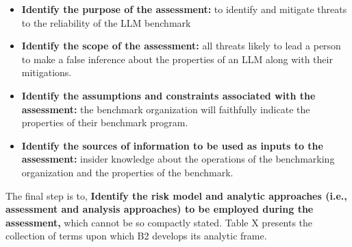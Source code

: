 \documentclass{article}
\begin{document}
\begin{itemize}
    \item {\bf Identify the purpose of the assessment:} to identify and mitigate threats to the reliability of the LLM benchmark
    \item {\bf Identify the scope of the assessment:} all threats likely to lead a person to make a false inference about the properties of an LLM along with their mitigations.
    \item {\bf Identify the assumptions and constraints associated with the assessment:} the benchmark organization will faithfully indicate the properties of their benchmark program.
    \item {\bf Identify the sources of information to be used as inputs to the assessment:} insider knowledge about the operations of the benchmarking organization and the properties of the benchmark.
\end{itemize}

The final step is to, {\bf Identify the risk model and analytic approaches (i.e., assessment and analysis approaches) to be employed during the assessment,} which cannot be so compactly stated. Table X presents the collection of terms upon which B2 develops its analytic frame.
\end{document}
